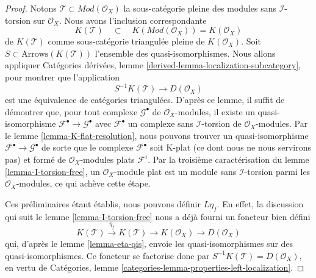 {\begin{proof}

Notons $\mathcal{T} \subset \textit{Mod}(\mathcal{O}_X)$ la sous-catégorie pleine des modules sans $\mathcal{I}$-torsion sur $\mathcal{O}_X$. Nous avons l'inclusion correspondante
$$
K(\mathcal{T})
\quad\subset\quad
K(\textit{Mod}(\mathcal{O}_X)) = K(\mathcal{O}_X)
$$
de $K(\mathcal{T})$ comme sous-catégorie triangulée pleine de $K(\mathcal{O}_X)$. Soit $S \subset \text{Arrows}(K(\mathcal{T}))$ l'ensemble des quasi-isomorphismes. Nous allons appliquer Catégories dérivées, lemme \ref{derived-lemma-localization-subcategory},
pour montrer que l'application
$$
S^{-1}K(\mathcal{T}) \longrightarrow D(\mathcal{O}_X)
$$
est une équivalence de catégories triangulées. D'après ce lemme, il suffit de démontrer que, pour tout complexe $\mathcal{G}^\bullet$ de
$\mathcal{O}_X$-modules, il existe un quasi-isomorphisme $\mathcal{F}^\bullet \to \mathcal{G}^\bullet$
avec $\mathcal{F}^\bullet$
un complexe sans $\mathcal{I}$-torsion de $\mathcal{O}_X$-modules. Par le lemme \ref{lemma-K-flat-resolution}, nous pouvons trouver un quasi-isomorphisme
$\mathcal{F}^\bullet \to \mathcal{G}^\bullet$ de sorte que le complexe
$\mathcal{F}^\bullet$ soit K-plat (ce dont nous ne nous servirons pas) et formé de $\mathcal{O}_X$-modules plats $\mathcal{F}^i$. Par la troisième caractérisation du lemme \ref{lemma-I-torsion-free},
un $\mathcal{O}_X$-module plat est un module sans
$\mathcal{I}$-torsion parmi les $\mathcal{O}_X$-modules, ce qui achève cette étape.

\medskip\noindent

Ces préliminaires étant établis, nous pouvons définir $L\eta_f$. En effet, la discussion qui suit le lemme \ref{lemma-I-torsion-free}
nous a déjà fourni un foncteur bien défini
$$
K(\mathcal{T}) \xrightarrow{\eta_f} K(\mathcal{T}) \to
K(\mathcal{O}_X) \to D(\mathcal{O}_X)
$$
qui, d'après le lemme \ref{lemma-eta-qis}, envoie les quasi-isomorphismes sur des quasi-isomorphismes. Ce foncteur se factorise donc par
$S^{-1}K(\mathcal{T}) = D(\mathcal{O}_X)$, en vertu de Catégories, lemme \ref{categories-lemma-properties-left-localization}.

\end{proof}

\noindent

}
